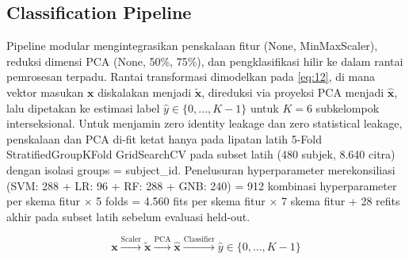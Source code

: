 \subsection{Classification Pipeline}
\label{sec:classification_pipeline_and_strategy}
\label{sec:classification_pipeline}

Pipeline modular mengintegrasikan penskalaan fitur (None, MinMaxScaler), reduksi dimensi PCA (None, 50\%, 75\%), dan pengklasifikasi hilir ke dalam rantai pemrosesan terpadu. Rantai transformasi dimodelkan pada \eqref{eq:12}, di mana vektor masukan $\mathbf{x}$ diskalakan menjadi $\tilde{\mathbf{x}}$, direduksi via proyeksi PCA menjadi $\hat{\mathbf{x}}$, lalu dipetakan ke estimasi label $\hat{y} \in \{0, \dots, K-1\}$ untuk $K = 6$ subkelompok interseksional. Untuk menjamin zero identity leakage dan zero statistical leakage, penskalaan dan PCA di-fit ketat hanya pada lipatan latih 5-Fold StratifiedGroupKFold GridSearchCV pada subset latih (480 subjek, 8.640 citra) dengan isolasi groups = subject\_id. Penelusuran hyperparameter merekonsiliasi (SVM: 288 + LR: 96 + RF: 288 + GNB: 240) = 912 kombinasi hyperparameter per skema fitur $\times$ 5 folds = 4.560 fits per skema fitur $\times$ 7 skema fitur + 28 refits akhir pada subset latih sebelum evaluasi held-out.

\begin{equation}
\mathbf{x} \xrightarrow{\text{Scaler}} \tilde{\mathbf{x}} \xrightarrow{\text{PCA}} \hat{\mathbf{x}} \xrightarrow{\text{Classifier}} \hat{y} \in \{0, \dots, K-1\}
\label{eq:12}
\end{equation}

